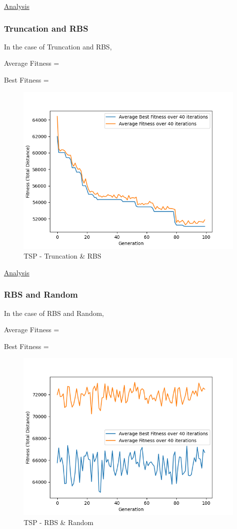 \documentclass[11pt, letterpaper]{article}
\begin{document}
\underline{Analysis}
\subsubsection {Truncation and RBS}
In the case of Truncation and RBS,

Average Fitness = 

Best Fitness = 
\begin{figure}[H]
    \centering
    \includegraphics[scale = 0.6]{images/tsp_tr_rb.png}
    \caption {TSP - Truncation \& RBS}
    \label {fig:tpsTR}
\end{figure}

\underline{Analysis}
\subsubsection {RBS and Random}
In the case of RBS and Random,

Average Fitness = 

Best Fitness = 
\begin{figure}[H]
    \centering
    \includegraphics[scale = 0.6]{images/tsp_rb_rd.png}
    \caption {TSP - RBS \& Random}
    \label {fig:tpsRbR}
\end{figure}
\end{document}

